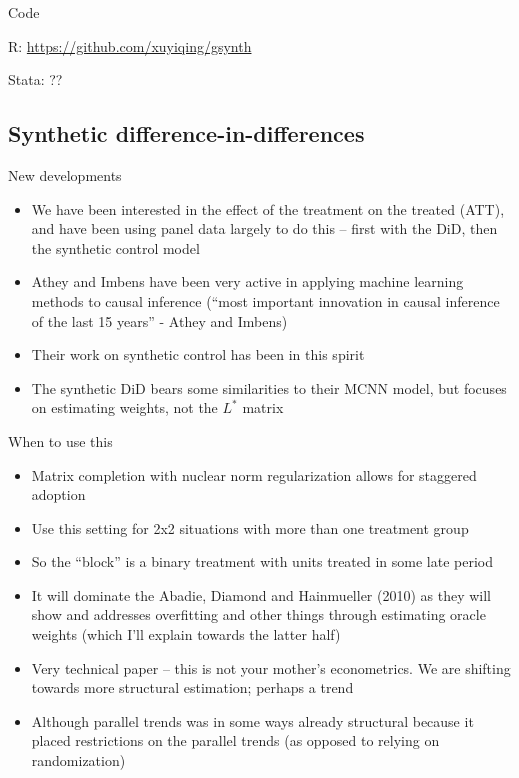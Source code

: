 \documentclass{beamer}
\begin{document}
\begin{frame}{Code}

R: \url{https://github.com/xuyiqing/gsynth}

\bigskip

Stata: ??

\end{frame}



\subsection{Synthetic difference-in-differences}

\begin{frame}{New developments}

\begin{itemize}
\item We have been interested in the effect of the treatment on the treated (ATT), and have been using panel data largely to do this -- first with the DiD, then the synthetic control model
\item Athey and Imbens have been very active in applying machine learning methods to causal inference (``most important innovation in causal inference of the last 15 years'' - Athey and Imbens)
\item Their work on synthetic control has been in this spirit
\item The synthetic DiD bears some similarities to their MCNN model, but focuses on estimating weights, not the $L^*$ matrix
\end{itemize}

\end{frame}

\begin{frame}{When to use this}

\begin{itemize}
\item Matrix completion with nuclear norm regularization allows for staggered adoption
\item Use this setting for 2x2 situations with more than one treatment group
\item So the ``block'' is a binary treatment with units treated in some late period
\item It will dominate the Abadie, Diamond and Hainmueller (2010) as they will show and addresses overfitting and other things through estimating oracle weights (which I'll explain towards the latter half)
\item Very technical paper -- this is not your mother's econometrics. We are shifting towards more structural estimation; perhaps a trend
\item Although parallel trends was in some ways already structural because it placed restrictions on the parallel trends (as opposed to relying on randomization)
\end{itemize}

\end{frame}
\end{document}
